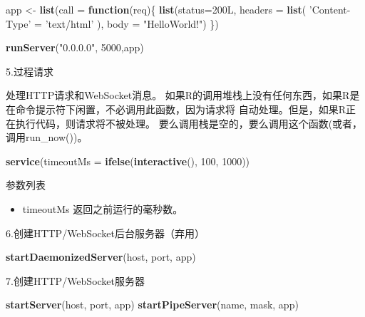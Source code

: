 \documentclass[]{book}
\newenvironment{Shaded}{\begin{snugshade}}{\end{snugshade}}
\newcommand{\KeywordTok}[1]{\textcolor[rgb]{0.13,0.29,0.53}{\textbf{#1}}}
\newcommand{\DataTypeTok}[1]{\textcolor[rgb]{0.13,0.29,0.53}{#1}}
\newcommand{\DecValTok}[1]{\textcolor[rgb]{0.00,0.00,0.81}{#1}}
\newcommand{\StringTok}[1]{\textcolor[rgb]{0.31,0.60,0.02}{#1}}
\newcommand{\ControlFlowTok}[1]{\textcolor[rgb]{0.13,0.29,0.53}{\textbf{#1}}}
\newcommand{\NormalTok}[1]{#1}
\providecommand{\tightlist}{%
  \setlength{\itemsep}{0pt}\setlength{\parskip}{0pt}}
\theoremstyle{definition}
\theoremstyle{definition}
\theoremstyle{definition}
\theoremstyle{remark}
\begin{document}
\begin{Shaded}
\begin{Highlighting}[]
\NormalTok{app <-}\StringTok{ }\KeywordTok{list}\NormalTok{(}\DataTypeTok{call =} \ControlFlowTok{function}\NormalTok{(req)\{}
  \KeywordTok{list}\NormalTok{(}\DataTypeTok{status=}\NormalTok{200L,}
       \DataTypeTok{headers =} \KeywordTok{list}\NormalTok{(}
         \StringTok{'Content-Type'}\NormalTok{ =}\StringTok{ 'text/html'}
\NormalTok{       ),}
       \DataTypeTok{body =} \StringTok{"HelloWorld!"}\NormalTok{)}
\NormalTok{\})}

\KeywordTok{runServer}\NormalTok{(}\StringTok{"0.0.0.0"}\NormalTok{, }\DecValTok{5000}\NormalTok{,app)}
\end{Highlighting}
\end{Shaded}

5.过程请求

处理HTTP请求和WebSocket消息。 如果R的调用堆栈上没有任何东西，如果R是
在命令提示符下闲置，不必调用此函数，因为请求将
自动处理。但是，如果R正在执行代码，则请求将不被处理。
要么调用栈是空的，要么调用这个函数(或者，调用run\_now())。

\begin{Shaded}
\begin{Highlighting}[]
\KeywordTok{service}\NormalTok{(}\DataTypeTok{timeoutMs =} \KeywordTok{ifelse}\NormalTok{(}\KeywordTok{interactive}\NormalTok{(), }\DecValTok{100}\NormalTok{, }\DecValTok{1000}\NormalTok{))}
\end{Highlighting}
\end{Shaded}

参数列表

\begin{itemize}
\tightlist
\item
  timeoutMs 返回之前运行的毫秒数。
\end{itemize}

6.创建HTTP/WebSocket后台服务器（弃用）

\begin{Shaded}
\begin{Highlighting}[]
\KeywordTok{startDaemonizedServer}\NormalTok{(host, port, app)}
\end{Highlighting}
\end{Shaded}

7.创建HTTP/WebSocket服务器

\begin{Shaded}
\begin{Highlighting}[]
\KeywordTok{startServer}\NormalTok{(host, port, app)}
\KeywordTok{startPipeServer}\NormalTok{(name, mask, app)}
\end{Highlighting}
\end{Shaded}
\end{document}

